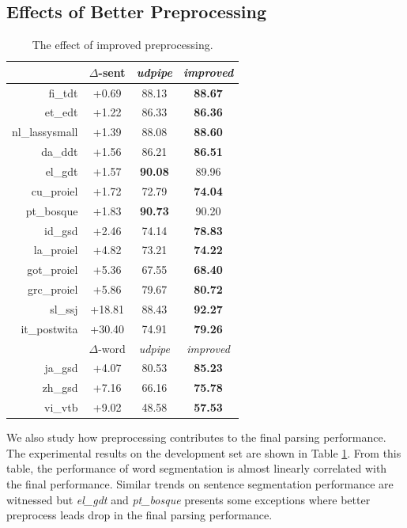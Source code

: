 \documentclass[11pt,a4paper]{article}
\begin{document}
\subsection{Effects of Better Preprocessing}
\begin{table}[t]
  \centering
  \small
  \begin{tabular}{rccc}
     & $\Delta$-sent & \textit{udpipe} & \textit{improved} \\
    \hline
    fi\_tdt & +0.69 & 88.13 & \textbf{88.67} \\
    et\_edt & +1.22 & 86.33 & \textbf{86.36} \\
    nl\_lassysmall & +1.39 & 88.08 & \textbf{88.60} \\
    da\_ddt & +1.56 & 86.21 & \textbf{86.51} \\
    el\_gdt & +1.57 & \textbf{90.08} & 89.96  \\
    cu\_proiel & +1.72 & 72.79 & \textbf{74.04} \\
    pt\_bosque & +1.83 & \textbf{90.73} & 90.20 \\
    id\_gsd & +2.46 & 74.14 & \textbf{78.83} \\
    la\_proiel & +4.82 & 73.21 & \textbf{74.22} \\
    got\_proiel & +5.36 & 67.55 & \textbf{68.40} \\
    grc\_proiel & +5.86 & 79.67 & \textbf{80.72} \\
    sl\_ssj & +18.81& 88.43 & \textbf{92.27} \\
    it\_postwita & +30.40 &74.91 & \textbf{79.26} \\
    \hline
    \hline
    & $\Delta$-word & \textit{udpipe} & \textit{improved} \\
    ja\_gsd & +4.07 & 80.53 & \textbf{85.23} \\
    zh\_gsd & +7.16 & 66.16 & \textbf{75.78} \\
    vi\_vtb & +9.02 & 48.58 & \textbf{57.53} \\
  \end{tabular}
\caption{The effect of improved preprocessing.}\label{tbl:preprocess}
\end{table}

We also study how preprocessing contributes to the final parsing performance.
The experimental results on the development set are shown in Table \ref{tbl:preprocess}.
From this table, the performance of word segmentation
is almost linearly correlated with the final performance.
Similar trends on sentence segmentation performance are witnessed
but \textit{el\_gdt} and \textit{pt\_bosque} presents some exceptions
where better preprocess leads drop in the final parsing performance.
\end{document}
